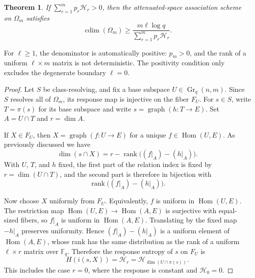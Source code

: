 \documentclass[11pt]{article}
\newtheorem{theorem}{Theorem}[section]
\theoremstyle{definition}
\theoremstyle{remark}
\newcommand{\F}{\mathbb F}
\newcommand{\Gr}{\operatorname{Gr}}
\newcommand{\Hom}{\operatorname{Hom}}
\newcommand{\rank}{\operatorname{rank}}
\newcommand{\cdim}{\operatorname{cdim}}
\begin{document}
\begin{theorem}\label{thm:attenuated-fiber}
If \(\sum_{r=1}^m p_r\mathcal H_r>0\), then the attenuated-space 
association scheme on \(\Omega_m\) satisfies
\[
        \cdim(\Omega_m)
        \geq
        \frac{m\ell\log q}{\sum_{r=1}^m p_r\mathcal H_r}.
\]
\end{theorem}

For \(\ell\geq1\), the denominator is automatically positive: \(p_m>0\),
and the rank of a uniform \(\ell\times m\) matrix is not deterministic.
The positivity condition only excludes the degenerate boundary \(\ell=0\).

\begin{proof}
Let \(S\) be class-resolving, and fix a base subspace \(U\in\Gr_q(n,m)\).  
Since \(S\)
resolves all of \(\Omega_m\), its response map is injective on the fiber
\(F_U\).  For \(s\in S\), write \(T=\pi(s)\) for its base subspace and 
write
\(s=\operatorname{graph}(h:T\to E)\).  Set \(A=U\cap T\) and \(r=\dim A\).

If \(X\in F_U\), then \(X=\operatorname{graph}(f:U\to E)\) for a unique
\(f\in\Hom(U,E)\).  As previously discussed we have
\[
        \dim(s\cap X)
        =
        r-\rank\bigl((f|_A)-(h|_A)\bigr).
\]
With \(U\), \(T\), and \(h\) fixed, the first part of the relation index 
is
fixed by \(r=\dim(U\cap T)\), and the second part is therefore in 
bijection with
\[
        \rank\bigl((f|_A)-(h|_A)\bigr).
\]

Now choose \(X\) uniformly from \(F_U\).  Equivalently, \(f\) is uniform 
in
\(\Hom(U,E)\).  The restriction map \(\Hom(U,E)\to\Hom(A,E)\) is 
surjective
with equal-sized fibers, so \(f|_A\) is uniform in \(\Hom(A,E)\).  
Translating by
the fixed map \(-h|_A\) preserves uniformity.  Hence
\((f|_A)-(h|_A)\) is a uniform element of \(\Hom(A,E)\), whose rank has 
the same
distribution as the rank of a uniform \(\ell\times r\) matrix over 
\(\F_q\).
Therefore the response entropy of \(s\) on \(F_U\) is
\[
        H(i(s,X))
        =
        \mathcal H_r
        =
        \mathcal H_{\dim(U\cap \pi(s))}.
\]
This includes the case \(r=0\), where the response is constant and
\(\mathcal H_0=0\).


\end{proof}
\end{document}
